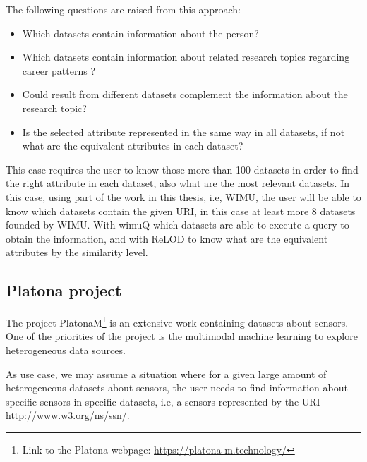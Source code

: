 The following questions are raised from this approach:
\begin{itemize}
    \item Which datasets contain information about the person?
    \item Which datasets contain information about related research topics regarding career patterns ?
    \item Could result from different datasets complement the information about the research topic?
    \item Is the selected attribute represented in the same way in all datasets, if not what are the equivalent attributes in each dataset?
\end{itemize}

This case requires the user to know those more than 100 datasets in order to find the right attribute in each dataset, also what are the most relevant datasets. In this case, using part of the work in this thesis, i.e, WIMU\cite{valdestilhas2018my}, the user will be able to know which datasets contain the given URI, in this case at least more 8 datasets founded by WIMU. With wimuQ\cite{ValdestilhasKcap} which datasets are able to execute a query to obtain the information, and with ReLOD\cite{valdestilhasSWJ2020} to know what are the equivalent attributes by the similarity level.



\subsection{Platona project} 
The project PlatonaM\footnote{Link to the Platona webpage: \url{https://platona-m.technology/}} is an extensive work containing datasets about sensors. One of the priorities of the project is the multimodal machine learning to explore heterogeneous data sources.

As use case, we may assume a situation where for a given large amount of heterogeneous datasets about sensors, the user needs to find information about specific sensors in specific datasets, i.e, a sensors represented by the URI \url{http://www.w3.org/ns/ssn/}.

